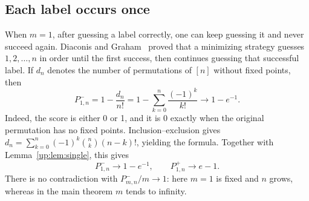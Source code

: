 \documentclass[11pt,reqno]{amsart}
\numberwithin{equation}{section}
\theoremstyle{remark}
\theoremstyle{definition}
\begin{document}
\subsection{Each label occurs once}
When $m=1$, after guessing a label correctly, one can keep guessing it and never succeed again. Diaconis and Graham~\cite[Theorem~6]{DG} proved that a minimizing strategy guesses $1,2,\ldots,n$ in order until the first success, then continues guessing that successful label. If $d_n$ denotes the number of permutations of $[n]$ without fixed points, then
\[
 P^-_{1,n}=1-\frac{d_n}{n!}
 =1-\sum_{k=0}^n\frac{(-1)^k}{k!}
 \longrightarrow1-e^{-1}.
\]
Indeed, the score is either 0 or 1, and it is 0 exactly when the original permutation has no fixed points. Inclusion--exclusion gives $d_n=\sum_{k=0}^n(-1)^k\binom nk(n-k)!$, yielding the formula. Together with Lemma~\ref{up:lem:single}, this gives
\[
 P^-_{1,n}\longrightarrow1-e^{-1},\qquad
 P^+_{1,n}\longrightarrow e-1.
\]
There is no contradiction with $P^-_{m,n}/m\to1$: here $m=1$ is fixed and $n$ grows, whereas in the main theorem $m$ tends to infinity.
\end{document}
